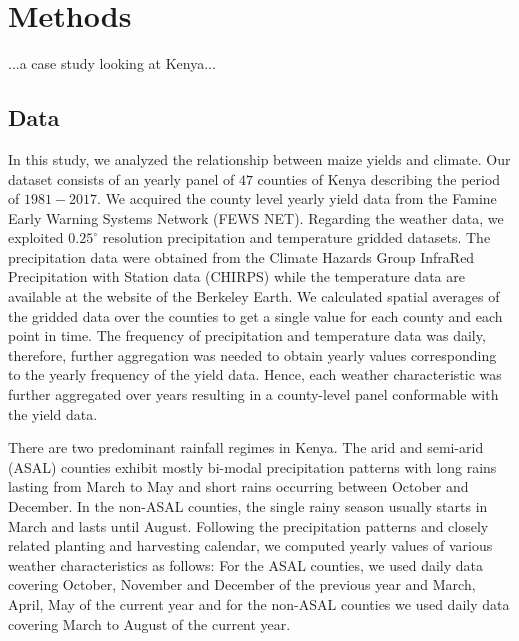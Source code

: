 \documentclass[12pt]{iopart}
\begin{document}
\section{Methods}\label{Methods}
\color{blue}

...a case study looking at Kenya...
\color{black}


 
\subsection{Data}\label{Data}

In this study, we analyzed the relationship between maize yields and climate. Our dataset consists of an yearly panel of $47$ counties of Kenya describing the period of $1981-2017$. 
	We acquired the county level yearly yield data from the Famine Early Warning Systems Network (FEWS NET). Regarding the weather data, we exploited $0.25^\circ$ resolution precipitation and temperature gridded datasets. The precipitation data were obtained from the Climate Hazards Group InfraRed Precipitation with Station data (CHIRPS) while the temperature data are available at the website of the Berkeley Earth. We calculated spatial averages of the gridded data over the counties to get a single value for each county and each point in time. The frequency of precipitation and temperature data was daily, therefore, further aggregation was needed to obtain yearly values corresponding to the yearly frequency of the yield data. Hence, each weather characteristic was further aggregated over years resulting in a county-level panel conformable with the yield data. 
	
	There are two predominant rainfall regimes in Kenya. The arid and semi-arid (ASAL) counties exhibit mostly bi-modal precipitation patterns with long rains lasting from March to May and short rains occurring between October and December. In the non-ASAL counties, the single rainy season usually starts in March and lasts until August. Following the precipitation patterns and closely related planting and harvesting calendar, we computed yearly values of various weather characteristics as follows: For the ASAL counties, we used daily data covering October, November and December of the previous year and March, April, May of the current year and for the non-ASAL counties we used daily data covering March to August of the current year.
\end{document}
